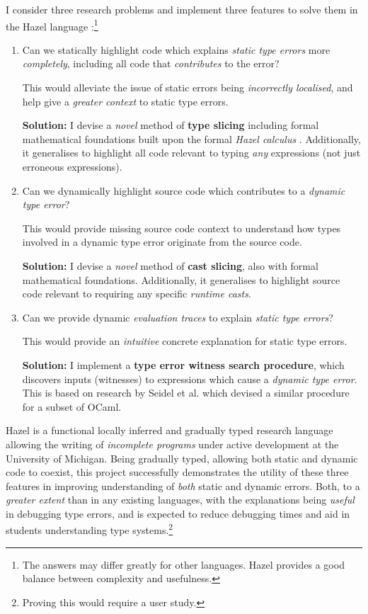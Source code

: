 I consider three research problems and implement three features to solve them in the Hazel language \cite{Hazel}:\footnote{The answers may differ greatly for other languages. Hazel provides a good balance between complexity and usefulness.}
\begin{enumerate}
\item Can we statically highlight code which explains \textit{static type errors} more \textit{completely}, including all code that \textit{contributes} to the error? 

This would alleviate the issue of static errors being \textit{incorrectly localised}, and help give a \textit{greater context} to static type errors.

\textbf{Solution:} I devise a \textit{novel} method of \textbf{type slicing} including formal mathematical foundations built upon the formal \textit{Hazel calculus} \cite{HazelLivePaper}. Additionally, it generalises to highlight all code relevant to typing \textit{any} expressions (not just erroneous expressions).

\item Can we dynamically highlight source code which contributes to a \textit{dynamic type error}?

This would provide missing source code context to understand how types involved in a dynamic type error originate from the source code.

\textbf{Solution:} I devise a \textit{novel} method of \textbf{cast slicing}, also with formal mathematical foundations. Additionally, it generalises to highlight source code relevant to requiring any specific \textit{runtime casts}.

\item Can we provide dynamic \textit{evaluation traces} to explain \textit{static type errors}?

This would provide an \textit{intuitive} concrete explanation for static type errors.

\textbf{Solution:} I implement a \textbf{type error witness search procedure}, which discovers inputs (witnesses) to expressions which cause a \textit{dynamic type error}. This is based on research by Seidel et al. \cite{SearchProc} which devised a similar procedure for a subset of OCaml.
\end{enumerate}

Hazel \cite{Hazel} is a functional locally inferred and gradually typed research language allowing the writing of \textit{incomplete programs} under active development at the University of Michigan. Being gradually typed, allowing both static and dynamic code to coexist, this project successfully demonstrates the utility of these three features in improving understanding of \textit{both} static and dynamic errors. Both, to a \textit{greater extent} than in any existing languages, with the explanations being \textit{useful} in debugging type errors, and is expected to reduce debugging times and aid in students understanding type systems.\footnote{Proving this would require a user study.}

